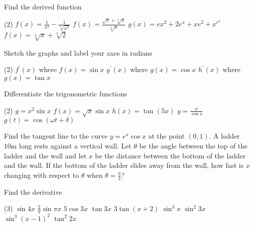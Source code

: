 \begin{Exercise}[title={Standard Derivatives},label=exStandardDerivatives]
	\Question Find the derived function
\begin{tasks}(2)
	\task $f (x) =\frac{1}{x^{3}} -\frac{1}{\sqrt[{4}]{x^{3}}}$ %
	\task $f (x) =\frac{\sqrt{x} +\sqrt[{3}]{x}}{\sqrt[{4}]{x}}$ %
	\task $g (x) =e x^{2} +2 e^{x} +x e^{2} +x^{e^{2}}$ %
	\task $f (x) =\sqrt[{3}]{x} +\sqrt[{5}]{2}$ %
\end{tasks}

\Question Sketch the graphs and label your axes in radians
	\begin{tasks}(2)
	\task $f^{ \prime } (x)$ where $f (x) =\sin  x$ %
	\task $g^{ \prime } (x)$ where $g (x) =\cos  x$  %
	\task $h^{ \prime } (x)$ where $g (x)  =\tan x$  %
\end{tasks}

\Question Differentiate the trigonometric functions
\begin{tasks}(2)
	\task $y =x^{2} \sin  x$ %
	\task $f (x) =\sqrt{x} \sin  x$ %
	\task $h (x) =\tan  (5 x)$ %
	\task $y =\frac{x}{\cos  x}$ %
	\task $g (t) =\cos  (\omega  t +\delta )$ %
\end{tasks}

\Question Find the tangent line to the curve $y =e^{x} \cos  x$ at the point $(0 ,1)$. %
\Question A ladder $10 \mbox{m}$ long rests against a vertical wall. Let $\theta $ be the angle between the top of the ladder and the wall and let $x$ be the distance between the bottom of the ladder and the wall. If the bottom of the ladder slides away from the wall, how fast is $x$ changing with respect to $\theta $ when $\theta  =\frac{\pi }{3}$? %

	\Question Find the derivative
\begin{tasks}(3)
	\task  $\sin  4 x$ %
	\task $\frac{2}{\pi } \sin  \pi  x$ %
	\task $5 \cos  3 x$ %
	\task $\tan  3 x$ 	%
	\task $3 \tan  \left (x +2\right )$  %
	\task $\sin ^{3} x$ %
	\task $\sin ^{2} 3 x$ %
	\task $\sin ^{3} \left (x -1\right )^{2}$ %
	\task $\tan ^{2} 2 x$ %
	
\end{tasks}

\end{Exercise}
